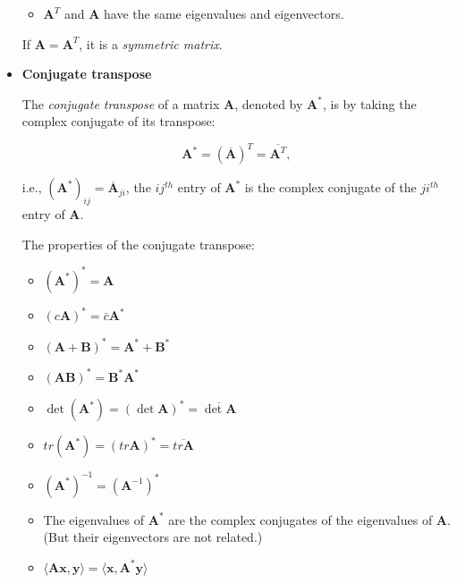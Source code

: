 \documentclass[10pt,b5paper,titlepage]{book}
\begin{document}
\begin{itemize}
\begin{itemize}
            \item $\mathbf{A}^{T}$ and $\mathbf{A}$ have the same eigenvalues
                and eigenvectors.
        \end{itemize}

        If $\mathbf{A} = \mathbf{A}^{T}$, it is a \textit{symmetric matrix}.

    \item \textbf{Conjugate transpose}

        The \textit{conjugate transpose} of a matrix $\mathbf{A}$, denoted by
        $\mathbf{A}^{*}$, is by taking the complex conjugate of its transpose:

        \begin{equation}
            \mathbf{A}^{*} = (\overline{\mathbf{A}})^{T} = \overline{\mathbf{A}^{T}}
        ,\end{equation}

        i.e., $(\mathbf{A}^{*})_{ij} = \overline{\mathbf{A}}_{ji}$, the $ij^{th}$
        entry of $\mathbf{A}^{*}$ is the complex conjugate of the $ji^{th}$ entry
        of $\mathbf{A}$.

        The properties of the conjugate transpose:

        \begin{itemize}
            \item $(\mathbf{A}^{*})^{*} = \mathbf{A}$
            \item $(c \mathbf{A})^{*} = \overline{c}\mathbf{A}^{*}$
            \item $(\mathbf{A} + \mathbf{B})^{*} = \mathbf{A}^{*} + \mathbf{B}^{*}$
            \item $(\mathbf{A}\mathbf{B})^{*} = \mathbf{B}^{*}\mathbf{A}^{*}$
            \item $\det(\mathbf{A}^{*}) = (\det \mathbf{A})^{*} = \overline{\det \mathbf{A}}$
            \item $tr(\mathbf{A}^{*}) = (tr \mathbf{A})^{*} = \overline{tr \mathbf{A}}$
            \item $(\mathbf{A^{*}})^{-1} = (\mathbf{A}^{-1})^{*}$
            \item The eigenvalues of $\mathbf{A}^{*}$ are the complex conjugates
                of the eigenvalues of $\mathbf{A}$. (But their eigenvectors are
                not related.)
            \item $\langle \mathbf{A}\mathbf{x}, \mathbf{y} \rangle = \langle \mathbf{x}, \mathbf{A}^{*}\mathbf{y} \rangle$
        \end{itemize}


\end{itemize}
\end{document}
